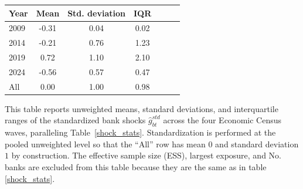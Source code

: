 \label{tab:bank_shocks_desc}
\begin{threeparttable}
\begin{tabular}{lcccccc}
\toprule
\textbf{Year} & Mean & Std. deviation & IQR \\
\midrule
2009 & -0.31 & 0.04 & 0.02 \\
2014 & -0.21 & 0.76 & 1.23 \\
2019 & 0.72 & 1.10 & 2.10 \\
2024 & -0.56 & 0.57 & 0.47 \\
\midrule
All & 0.00 & 1.00 & 0.98 \\
\bottomrule
\end{tabular}
\begin{tablenotes}[flushleft]
\item This table reports unweighted means, standard deviations, and
interquartile ranges of the standardized bank shocks $\hat{g}_{bt}^{std}$
across the four Economic Census waves, paralleling
Table~\ref{shock_stats}. Standardization is performed at the pooled
unweighted level so that the ``All'' row has mean $0$ and standard
deviation $1$ by construction. The effective sample size (ESS), largest
exposure, and No. banks are excluded from this table because they are the same as in table \ref{shock_stats}.
\end{tablenotes}
\end{threeparttable}